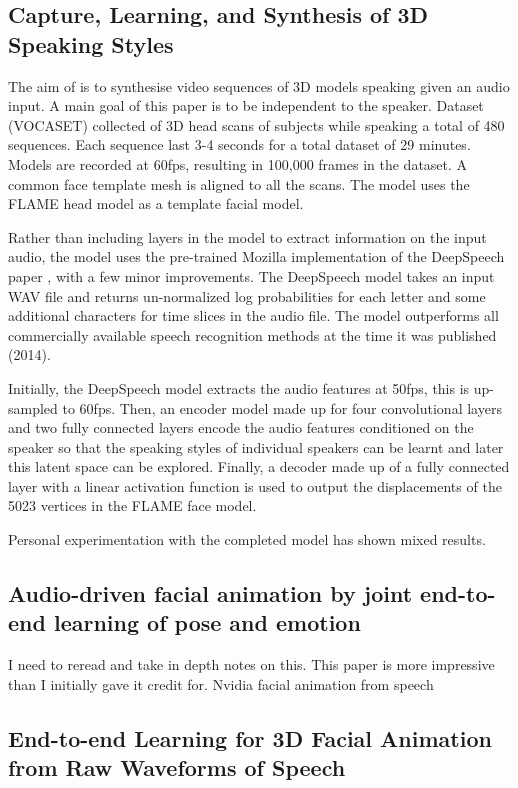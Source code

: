 \documentclass[12pt]{article}
\begin{document}
\subsection{Capture, Learning, and Synthesis of {3D} Speaking Styles}
The aim of \cite{Cudeiro2019} is to synthesise video sequences of 3D models speaking given an audio input.
A main goal of this paper is to be independent to the speaker.
Dataset (VOCASET) collected of 3D head scans of subjects while speaking a total of 480 sequences.
Each sequence last 3-4 seconds for a total dataset of 29 minutes.
Models are recorded at 60fps, resulting in 100,000 frames in the dataset.
A common face template mesh is aligned to all the scans.
The model uses the FLAME head model \cite{Li2017} as a template facial model.

Rather than including layers in the model to extract information on the input audio, the model uses the pre-trained Mozilla implementation of the DeepSpeech paper \cite{Hannun2014}, with a few minor improvements.
The DeepSpeech model takes an input WAV file and returns un-normalized log probabilities for each letter and some additional characters for time slices in the audio file.
The model outperforms all commercially available speech recognition methods at the time it was published (2014).

Initially, the DeepSpeech model extracts the audio features at 50fps, this is up-sampled to 60fps.
Then, an encoder model made up for four convolutional layers and two fully connected layers encode the audio features conditioned on the speaker so that the speaking styles of individual speakers can be learnt and later this latent space can be explored. 
Finally, a decoder made up of a fully connected layer with a linear activation function is used to output the displacements of the 5023 vertices in the FLAME face model.

Personal experimentation with the completed model has shown mixed results.

\subsection{Audio-driven facial animation by joint end-to-end learning of pose and emotion}
I need to reread and take in depth notes on this.
This paper is more impressive than I initially gave it credit for.
Nvidia facial animation from speech \cite{Karras2017a}

\subsection{End-to-end Learning for 3D Facial Animation from Raw Waveforms of Speech}
\cite{Pham2017}
\end{document}

